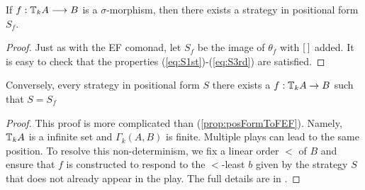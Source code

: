 \begin{prop}
If $f:{\mathbb{T}_{k}A} \longrightarrow B$ is a $\sigma$-morphism, then there exists a strategy in positional form $S_{f}$.
\begin{proof}
Just as with the EF comonad, let $S_{f}$ be the image of $\theta_{f}$ with ${[\:]}$ added. It is easy to check that the properties (\ref{eq:S1st})-(\ref{eq:S3rd}) are satisfied.
\end{proof}
\label{prop:fToPosFormP}
\end{prop}
\begin{prop}
Conversely, every strategy in positional form $S$ there exists a $f:{\mathbb{T}_{k}A} \rightarrow B$ such that $S = S_{f}$
\begin{proof}
This proof is more complicated than (\ref{prop:posFormToFEF}). Namely, ${\mathbb{T}_{k}A}$ is a infinite set and $\Gamma_{k}(A,B)$ is finite. Multiple plays can lead to the same position. To resolve this non-determinism, we fix a linear order $<$ of $B$ and ensure that $f$ is constructed to respond to the $<$-least $b$ given by the strategy $S$ that does not already appear in the play. The full details are in \cite[Proposition 9]{Abramsky2017}.
\end{proof}
\label{prop:posFormToFP}
\end{prop}
